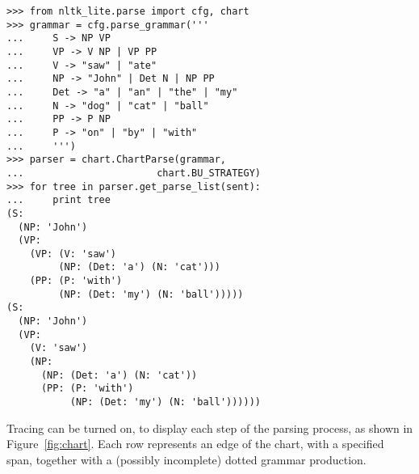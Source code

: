 \documentclass[11pt]{article}
\begin{document}
{\small\begin{verbatim}
>>> from nltk_lite.parse import cfg, chart
>>> grammar = cfg.parse_grammar('''
...     S -> NP VP
...     VP -> V NP | VP PP
...     V -> "saw" | "ate"
...     NP -> "John" | Det N | NP PP
...     Det -> "a" | "an" | "the" | "my"
...     N -> "dog" | "cat" | "ball"
...     PP -> P NP
...     P -> "on" | "by" | "with"
...     ''')
>>> parser = chart.ChartParse(grammar,
...                       chart.BU_STRATEGY)
>>> for tree in parser.get_parse_list(sent):
...     print tree
(S:
  (NP: 'John')
  (VP:
    (VP: (V: 'saw')
         (NP: (Det: 'a') (N: 'cat')))
    (PP: (P: 'with')
         (NP: (Det: 'my') (N: 'ball')))))
(S:
  (NP: 'John')
  (VP:
    (V: 'saw')
    (NP:
      (NP: (Det: 'a') (N: 'cat'))
      (PP: (P: 'with')
           (NP: (Det: 'my') (N: 'ball'))))))
\end{verbatim}}

Tracing can be turned on, to display each step of the parsing process,
as shown in Figure~\ref{fig:chart}.  Each row represents an edge
of the chart, with a specified span, together with a (possibly
incomplete) dotted grammar production.
\end{document}

